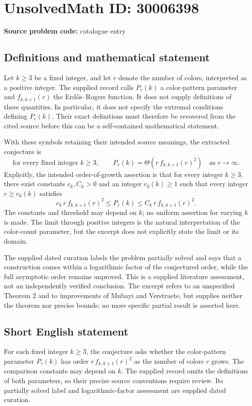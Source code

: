 \documentclass[11pt]{article}
\begin{document}
\section*{UnsolvedMath ID: 30006398}
\textbf{Source problem code:} catalogue entry
\subsection{Definitions and mathematical statement}
Let \(k\geq 3\) be a fixed integer, and let \(r\) denote the number of colors, interpreted as a positive integer. The supplied record calls \(P_r(k)\) a color-pattern parameter and \(f_{k,k+1}(r)\) the Erd\H{o}s--Rogers function. It does not supply definitions of these quantities. In particular, it does not specify the extremal conditions defining \(P_r(k)\). Their exact definitions must therefore be recovered from the cited source before this can be a self-contained mathematical statement.

With these symbols retaining their intended source meanings, the extracted conjecture is
\[
\text{for every fixed integer }k\geq 3,\qquad
P_r(k)=\Theta\!\left(r\,f_{k,k+1}(r)^2\right)
\quad\text{as }r\to\infty.
\]
Explicitly, the intended order-of-growth assertion is that for every integer \(k\geq 3\), there exist constants \(c_k,C_k>0\) and an integer \(r_0(k)\geq 1\) such that every integer \(r\geq r_0(k)\) satisfies
\[
c_k\,r\,f_{k,k+1}(r)^2
\leq P_r(k)
\leq C_k\,r\,f_{k,k+1}(r)^2.
\]
The constants and threshold may depend on \(k\); no uniform assertion for varying \(k\) is made. The limit through positive integers is the natural interpretation of the color-count parameter, but the excerpt does not explicitly state the limit or its domain.

The supplied dated curation labels the problem partially solved and says that a construction comes within a logarithmic factor of the conjectured order, while the full asymptotic order remains unproved. This is a supplied literature assessment, not an independently verified conclusion. The excerpt refers to an unspecified Theorem 2 and to improvements of Mubayi and Verstraete, but supplies neither the theorem nor precise bounds; no more specific partial result is asserted here.
\subsection{Short English statement}
For each fixed integer \(k\geq 3\), the conjecture asks whether the color-pattern parameter \(P_r(k)\) has order \(r\,f_{k,k+1}(r)^2\) as the number of colors \(r\) grows. The comparison constants may depend on \(k\). The supplied record omits the definitions of both parameters, so their precise source conventions require review. Its partially solved label and logarithmic-factor assessment are supplied dated curation.
\end{document}
